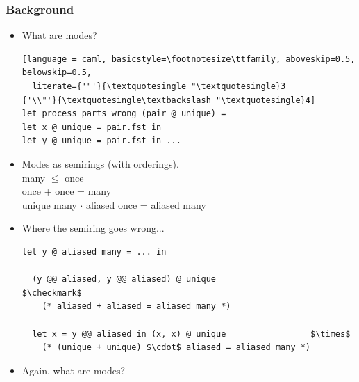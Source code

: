\documentclass[9pt]{beamer}
\makeatletter
\DeclareMathOperator{\llet}{\text{let}}
\DeclareMathOperator{\lin}{\text{in}}
\DeclareMathOperator{\bbox}{\text{box}}
\newcommand{\at}{\mathbin{\mbox{\small\ensuremath{@}}}}
\newcommand{\tee}{\vdash}
\makeatother
\begin{document}
\begin{frame}[fragile]
\frametitle{Background}

\begin{itemize}
\setlength{\itemsep}{1em}
  \item What are modes?
  \begin{lstlisting}[language = caml, basicstyle=\footnotesize\ttfamily, aboveskip=0.5, belowskip=0.5,
  literate={'"'}{\textquotesingle "\textquotesingle}3           {'\\"'}{\textquotesingle\textbackslash "\textquotesingle}4]
let process_parts_wrong (pair @ unique) =
let x @ unique = pair.fst in
let y @ unique = pair.fst in ... 
  \end{lstlisting}
  \item Modes as semirings (with orderings). \\
  many $\le$ once \\
  once + once = many \\
  unique many $\cdot$ aliased once = aliased many \\

  \item Where the semiring goes wrong... \\
  \begin{lstlisting}[language = caml, basicstyle=\footnotesize\ttfamily, aboveskip=0.5, belowskip=0.5, mathescape=true]
let y @ aliased many = ... in

  (y @@ aliased, y @@ aliased) @ unique                   $\checkmark$
    (* aliased + aliased = aliased many *)
    
  let x = y @@ aliased in (x, x) @ unique                 $\times$
    (* (unique + unique) $\cdot$ aliased = aliased many *)
  \end{lstlisting}
\item Again, what are modes?


\end{itemize}

\end{frame}
\end{document}

